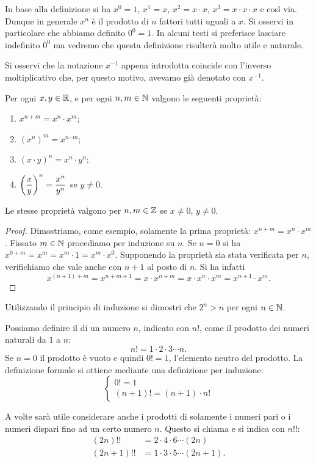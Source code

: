 In base alla definizione si ha $x^0 = 1$, $x^1=x$, $x^2=x\cdot x$,
$x^3=x\cdot x \cdot x$ e così via. Dunque in generale
$x^n$ è il prodotto di $n$ fattori tutti uguali a $x$.
Si osservi in particolare che abbiamo definito $0^0=1$.
In alcuni testi si preferisce lasciare indefinito $0^0$
ma vedremo che questa definizione risulterà
molto utile e naturale.

Si osservi che la notazione
$x^{-1}$ appena introdotta coincide
con l'inverso moltiplicativo che, per questo motivo, avevamo già denotato
con $x^{-1}$.

\begin{theorem}
Per ogni $x,y\in \mathbb R$, e per ogni $n,m \in \mathbb N$
valgono le seguenti proprietà:
\begin{enumerate}
  \item  $x^{n+m} = x^n \cdot x^m$;
  \item $(x^n)^m = x^{n\cdot m}$;
  \item $(x\cdot y)^n = x^n \cdot y^n$;
  \item $\displaystyle {\left( \frac{x}{y} \right)}^n = \frac{x^n}{y^n}$ se $y\neq 0$.
\end{enumerate}
Le stesse proprietà valgono per $n,m \in\mathbb Z$ se $x\neq 0$, $y\neq 0$.
\end{theorem}
%
\begin{proof}
Dimostriamo, come esempio, solamente la prima proprietà: $x^{n+m} = x^n \cdot x^m$.
Fissato $m\in \mathbb N$ procediamo per induzione su $n$.
Se $n=0$ si ha $x^{0+m} = x^m = x^m \cdot 1 = x^m \cdot x^0$.
Supponendo la proprietà sia stata verificata per $n$, verifichiamo
che vale anche con $n+1$ al posto di $n$. Si ha infatti
\[
 x^{(n+1)+m} = x^{n+m+1} = x \cdot x^{n+m} = x \cdot x^n \cdot x^m
  = x^{n+1} \cdot x^m.
\]
\end{proof}

\begin{exercise}
Utilizzando il principio di induzione
si dimostri che $2^n > n$ per ogni $n\in \mathbb N$.
\end{exercise}

\begin{definition}[fattoriale]
Possiamo definire il  di un numero $n$, indicato con $n!$, come il prodotto
dei numeri naturali da $1$ a $n$:
\[
  n!  = 1 \cdot 2 \cdot 3 \cdots n.
\]
Se $n=0$ il prodotto è vuoto e quindi $0!=1$, l'elemento neutro del prodotto.
La definizione formale si ottiene mediante una definizione per induzione:
\[
  \begin{cases}
    0! = 1 \\
    (n+1)! = (n+1) \cdot n!
  \end{cases}
\]

A volte sarà utile considerare anche i prodotti di solamente i numeri
pari o i numeri dispari fino ad un certo numero $n$. Questo
si chiama  e si indica con $n!!$:
\begin{align*}
  (2n)!! &= 2 \cdot 4 \cdot 6 \cdots (2n) \\
  (2n+1)!! &= 1 \cdot 3 \cdot 5 \cdots (2n+1).
\end{align*}
\end{definition}

